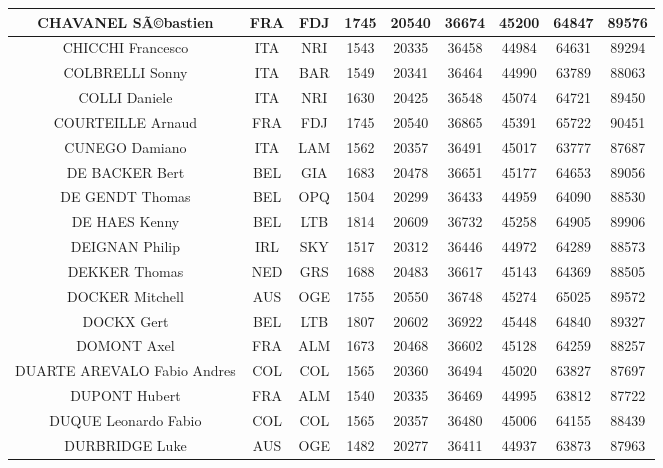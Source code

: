 \documentclass[8pt]{article}
\begin{document}
\begin{table}[h]
\begin{tabular}{|c|c|c|c|c|c|c|c|c|}
CHAVANEL SÃ©bastien &FRA & FDJ & 1745 & 20540 & 36674 & 45200 & 64847 & 89576\\ \hline
CHICCHI Francesco &ITA & NRI & 1543 & 20335 & 36458 & 44984 & 64631 & 89294\\ \hline
COLBRELLI Sonny &ITA & BAR & 1549 & 20341 & 36464 & 44990 & 63789 & 88063\\ \hline
COLLI Daniele &ITA & NRI & 1630 & 20425 & 36548 & 45074 & 64721 & 89450\\ \hline
COURTEILLE Arnaud &FRA & FDJ & 1745 & 20540 & 36865 & 45391 & 65722 & 90451\\ \hline
CUNEGO Damiano &ITA & LAM & 1562 & 20357 & 36491 & 45017 & 63777 & 87687\\ \hline
DE BACKER Bert &BEL & GIA & 1683 & 20478 & 36651 & 45177 & 64653 & 89056\\ \hline
DE GENDT Thomas &BEL & OPQ & 1504 & 20299 & 36433 & 44959 & 64090 & 88530\\ \hline
DE HAES Kenny &BEL & LTB & 1814 & 20609 & 36732 & 45258 & 64905 & 89906\\ \hline
DEIGNAN Philip &IRL & SKY & 1517 & 20312 & 36446 & 44972 & 64289 & 88573\\ \hline
DEKKER Thomas &NED & GRS & 1688 & 20483 & 36617 & 45143 & 64369 & 88505\\ \hline
DOCKER Mitchell &AUS & OGE & 1755 & 20550 & 36748 & 45274 & 65025 & 89572\\ \hline
DOCKX Gert &BEL & LTB & 1807 & 20602 & 36922 & 45448 & 64840 & 89327\\ \hline
DOMONT Axel &FRA & ALM & 1673 & 20468 & 36602 & 45128 & 64259 & 88257\\ \hline
DUARTE AREVALO Fabio Andres &COL & COL & 1565 & 20360 & 36494 & 45020 & 63827 & 87697\\ \hline
DUPONT Hubert &FRA & ALM & 1540 & 20335 & 36469 & 44995 & 63812 & 87722\\ \hline
DUQUE Leonardo Fabio &COL & COL & 1565 & 20357 & 36480 & 45006 & 64155 & 88439\\ \hline
DURBRIDGE Luke &AUS & OGE & 1482 & 20277 & 36411 & 44937 & 63873 & 87963\\ \hline
\end{tabular}
\end{table}
\end{document}
